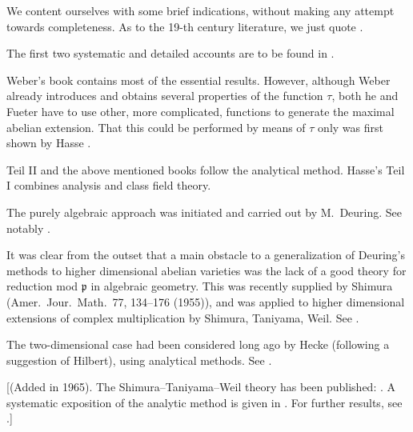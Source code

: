 We content ourselves with some brief indications, without making any
attempt towards completeness. As to the 19-th century literature, we just
quote \cite{kroneckerWerke}.

The first two systematic and detailed accounts are to be found in
\cite{weber1908algebra,fueter1924moduln,fueter1927moduln}.

Weber's book contains most of the essential results. However, although
Weber already introduces and obtains several properties of the function
$\tau$, both he and Fueter have to use other, more complicated, functions
to generate the maximal abelian extension. That this could be performed
by means of $\tau$ only was first shown by Hasse
\cite{hasse1927neue,hasse1931neue}.

Teil II and the above mentioned books follow the analytical method.
Hasse's Teil I combines analysis and class field theory.

The purely algebraic approach was initiated and carried out by
M.~Deuring. See notably \cite{deuring1947algebraische,deuring1952struktur}.

It was clear from the outset that a main obstacle to a generalization of
Deuring's methods to higher dimensional abelian varieties was the lack of
a good theory for reduction mod $\mathfrak{p}$ in algebraic geometry.
This was recently supplied by Shimura \cite{shimura1955reduction}
(Amer.\ Jour.\ Math.\ 77, 134--176 (1955)), and was applied to higher
dimensional extensions of complex multiplication by Shimura, Taniyama,
Weil. See \cite{shimura1955tokyo,taniyama1955tokyo,weil1955tokyo}.

The two-dimensional case had been considered long ago by Hecke (following
a suggestion of Hilbert), using analytical methods. See
\cite{hecke1912hohere,hecke1913konstruktion}.

[(Added in 1965). The Shimura--Taniyama--Weil theory has been published:
\cite{shimuramataniyama1961}. A systematic exposition of the analytic
method is given in \cite{deuringklassenkorper}. For further results, see
\cite{ramachandra1964applications}.]
